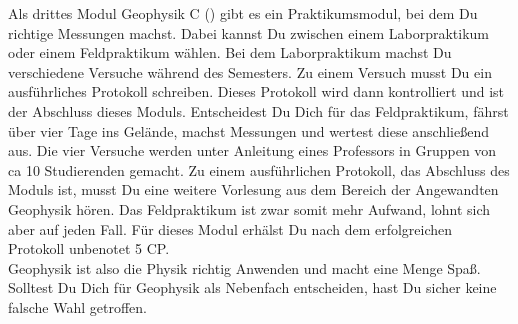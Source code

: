 Als drittes Modul Geophysik C () gibt es ein Praktikumsmodul, bei dem Du richtige Messungen machst. Dabei kannst Du zwischen einem Laborpraktikum oder einem Feldpraktikum wählen. Bei dem Laborpraktikum machst Du verschiedene Versuche während des Semesters. Zu einem Versuch musst Du ein ausführliches Protokoll schreiben. Dieses Protokoll wird dann kontrolliert und ist der Abschluss dieses Moduls. Entscheidest Du Dich für das Feldpraktikum, fährst über vier Tage ins Gelände, machst Messungen und wertest diese anschlie\ss end aus. Die vier Versuche werden unter Anleitung eines Professors in Gruppen von ca 10 Studierenden gemacht. Zu einem ausführlichen Protokoll, das Abschluss des Moduls ist, musst Du eine weitere Vorlesung aus dem Bereich der Angewandten Geophysik hören. Das Feldpraktikum ist zwar somit mehr Aufwand, lohnt sich aber auf jeden Fall. Für dieses Modul erhälst Du nach dem erfolgreichen Protokoll unbenotet 5 CP.\\
Geophysik ist also die Physik richtig Anwenden und macht eine Menge Spa\ss . Solltest Du Dich für Geophysik als Nebenfach entscheiden, hast Du sicher keine falsche Wahl getroffen.
